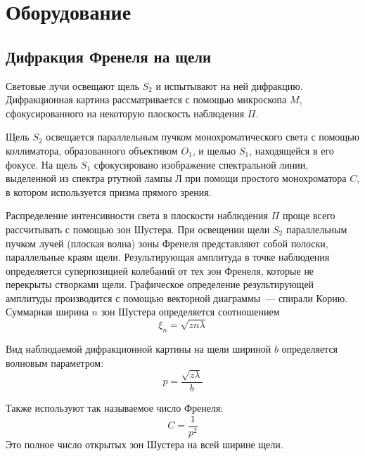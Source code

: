\section{Оборудование}
\subsection{Дифракция Френеля на щели}
\begin{figure}[ht!]
\end{figure}

Световые лучи освещают щель $S_{2}$ и испытывают на ней дифракцию. Дифракционная картина рассматривается с помощью микроскопа $M$, сфокусированного на некоторую плоскость наблюдения $\Pi$.

Щель $S_{2}$ освещается параллельным пучком монохроматического света с помощью коллиматора, образованного объективом $O_{1}$, и щелью $S_{1}$, находящейся в его фокусе. На щель $S_{1}$ сфокусировано изображение спектральной линии, выделенной из спектра ртутной лампы Л при помощи простого монохроматора $C$, в котором используется призма прямого зрения.

Распределение интенсивности света в плоскости наблюдения $\Pi$ проще всего рассчитывать с помощью зон Шустера. При освещении щели $S_{2}$ параллельным пучком лучей (плоская волна) зоны Френеля представляют собой полоски, параллельные краям щели. Результирующая амплитуда в точке наблюдения определяется суперпозицией колебаний от тех зон Френеля, которые не перекрыты створками щели. Графическое определение результирующей амплитуды производится с помощью векторной диаграммы~--- спирали Корню. Суммарная ширина $n$ зон Шустера  определяется соотношением
\[
    \xi_{n} = \sqrt{zn \lambda}
\]

Вид наблюдаемой дифракционной картины на щели шириной $b$ определяется волновым параметром:
\[
    p = \frac{\sqrt{z \lambda}}{b}  
\]

Также используют так называемое число Френеля:
\[
    C = \frac{1}{p^{2}}
\]
Это полное число открытых зон Шустера на всей ширине щели.

